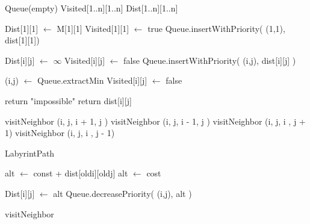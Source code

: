 \documentclass[a4paper]{article}
\begin{document}
\begin{algorithm}[H]
\SetAlgoLined
{}
Queue(empty)\newline
Visited[1..n][1..n]\newline
Dist[1..n][1..n]\newline

Dist[1][1] $\leftarrow$ M[1][1]\newline
Visited[1][1]  $\leftarrow$ true\newline
Queue.insertWithPriority( (1,1), dist[1][1])\newline

 {
	 {
		 {
			Dist[i][j] $\leftarrow$ $\infty$ \newline
			Visited[i][j] $\leftarrow$ false\newline
			Queue.insertWithPriority( (i,j), dist[i][j] )
		}
	}
}


 {
	(i,j) $\leftarrow$ Queue.extractMin\newline
	Visited[i][j] $\leftarrow$ false\newline
	
	 {
		return "impossible"
	}
	 {
		return dist[i][j]
	}
	
	visitNeighbor (i, j, i + 1, j  )\newline
	visitNeighbor (i, j, i - 1, j  )\newline
	visitNeighbor (i, j, i    , j + 1)\newline
	visitNeighbor (i, j, i    , j - 1)\newline
	
	
}

\caption{LabyrintPath}
\end{algorithm}

\begin{algorithm}[H]
\SetAlgoLined



 {
	alt $\leftarrow$ const + dist[oldi][oldj]
} {
	alt $\leftarrow$ cost
}

 {
	Dist[i][j] $\leftarrow$ alt\newline
	Queue.decreasePriority( (i,j), alt )
}

\caption{visitNeighbor}
\end{algorithm}
\end{document}
